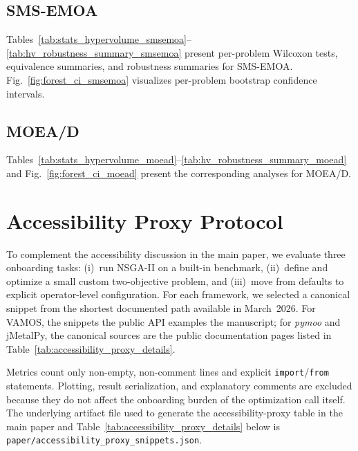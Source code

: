 \documentclass[final,5p,times,twocolumn]{elsarticle}
\newcommand{\VAMOS}{VAMOS}
\begin{document}
\subsection{SMS-EMOA}

Tables~\ref{tab:stats_hypervolume_smsemoa}--\ref{tab:hv_robustness_summary_smsemoa} present per-problem Wilcoxon tests, equivalence summaries, and robustness summaries for SMS-EMOA. Fig.~\ref{fig:forest_ci_smsemoa} visualizes per-problem bootstrap confidence intervals.

\begingroup
\setlength{\tabcolsep}{2pt}

\endgroup

\subsection{MOEA/D}

Tables~\ref{tab:stats_hypervolume_moead}--\ref{tab:hv_robustness_summary_moead} and Fig.~\ref{fig:forest_ci_moead} present the corresponding analyses for MOEA/D.

\begingroup
\setlength{\tabcolsep}{2pt}

\endgroup

\section{Accessibility Proxy Protocol}
\label{app:accessibility_protocol}

To complement the accessibility discussion in the main paper, we evaluate three onboarding tasks: (i)~run NSGA-II on a built-in benchmark, (ii)~define and optimize a small custom two-objective problem, and (iii)~move from defaults to explicit operator-level configuration. For each framework, we selected a canonical snippet from the shortest documented path available in March~2026. For \VAMOS{}, the snippets  the public API examples  the manuscript; for \textit{pymoo} and jMetalPy, the canonical sources are the public documentation pages listed in Table~\ref{tab:accessibility_proxy_details}.

Metrics count only non-empty, non-comment lines and explicit \texttt{import}/\texttt{from} statements. Plotting, result serialization, and explanatory comments are excluded because they do not affect the onboarding burden of the optimization call itself. The underlying artifact file used to generate the accessibility-proxy table in the main paper and Table~\ref{tab:accessibility_proxy_details} below is \texttt{paper/accessibility\_proxy\_snippets.json}.
\end{document}
